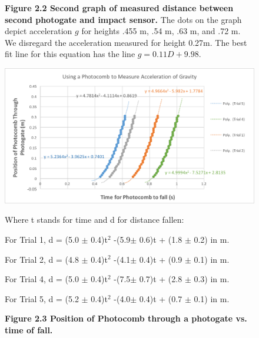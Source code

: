 \documentclass[11pt]{report}
\begin{document}
\begin{figure}[h!]
\captionsetup{labelformat=empty}
\caption{\textbf{Figure 2.2  Second graph of measured distance between second photogate and
impact sensor.} The dots on the graph depict acceleration \(g\) for heights .455 m, .54
m, .63 m, and .72 m.  We disregard the acceleration measured for height 0.27m.  
The best fit line for this equation has the line
\(g = 0.11D + 9.98\).}
\end{figure}

\begin{figure}[h!]
    \includegraphics[width=\linewidth]{Photocomb1.png}
    \captionsetup{labelformat=empty}
    \caption{\textbf{Figure 2.3 Position of Photocomb through a photogate vs.
    time of fall.}} 
    Where t stands for time and d for distance fallen: 
    
    For Trial 1, d = (5.0 $\pm$ 0.4)t$^2$ -(5.9$\pm$ 0.6)t + (1.8 $\pm$ 0.2) in m.

    For Trial 2, d = (4.8 $\pm$ 0.4)t$^2$ -(4.1$\pm$ 0.4)t + (0.9 $\pm$ 0.1) in m. 

    For Trial 4, d = (5.0 $\pm$ 0.4)t$^2$ -(7.5$\pm$ 0.7)t + (2.8 $\pm$ 0.3) in m.

    For Trial 5, d = (5.2 $\pm$ 0.4)t$^2$ -(4.0$\pm$ 0.4)t + (0.7 $\pm$ 0.1) in m.

\end{figure}
\end{document}
